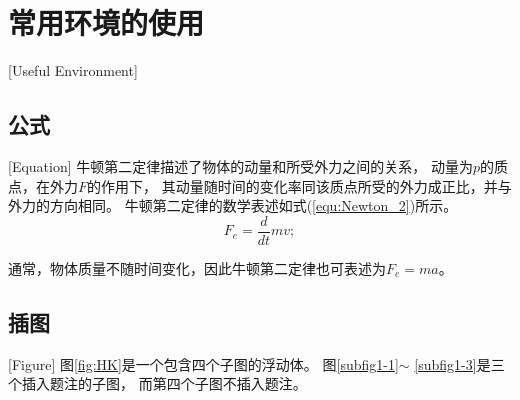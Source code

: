 
\chapter{常用环境的使用}[Useful Environment]
\section{公式}[Equation]
牛顿第二定律描述了物体的动量和所受外力之间的关系，
动量为$p$的质点，在外力$F$的作用下，
其动量随时间的变化率同该质点所受的外力成正比，并与外力的方向相同。
牛顿第二定律的数学表述如式(\ref{equ:Newton_2})所示。
\begin{equation}
  F_e=\frac{d}{dt}mv;
  \label{equ:Newton_2}
\end{equation}

\begin{note}
\end{note}

通常，物体质量不随时间变化，因此牛顿第二定律也可表述为$F_e=ma$。


\section{插图}[Figure]
图\ref{fig:HK}是一个包含四个子图的浮动体。
图\ref{subfig1-1}$\sim$ \ref{subfig1-3}是三个插入题注的子图，
而第四个子图不插入题注。

